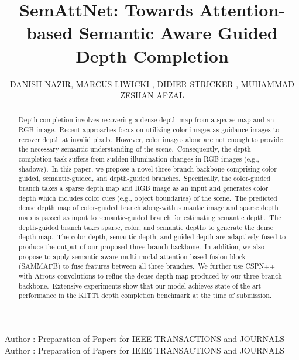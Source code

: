 \documentclass{ieeeaccess}
\begin{document}

\title{SemAttNet: Towards Attention-based Semantic Aware Guided Depth Completion}
\author{\uppercase{Danish Nazir},
\uppercase{Marcus Liwicki , Didier Stricker , Muhammad Zeshan Afzal 
}
}
\address[1]{Deutsches Forschungszentrum für Künstliche Intelligenz (DFKI) Trippstadter Str. 122, 67663 Kaiserslautern (e-mail: first.last@dfki.de)}
\address[2]{Luleå University of Technology (e-mail: first.last@ltu.se)}



\markboth
{Author \headeretal: Preparation of Papers for IEEE TRANSACTIONS and JOURNALS}
{Author \headeretal: Preparation of Papers for IEEE TRANSACTIONS and JOURNALS}



\begin{abstract}
Depth completion involves recovering a dense depth map from a sparse map and an RGB image.~Recent approaches focus on utilizing color images as guidance images to recover depth at invalid pixels.~However, color images alone are not enough to provide the necessary semantic understanding of the scene.~Consequently, the depth completion task suffers from sudden illumination changes in RGB images (e.g., shadows).~In this paper, we propose a novel three-branch backbone comprising color-guided, semantic-guided, and depth-guided branches.~Specifically, the color-guided branch takes a sparse depth map and RGB image as an input and generates color depth which includes color cues (e.g., object boundaries) of the scene.~The predicted dense depth map of color-guided branch along-with
semantic image and sparse depth map is passed as input to semantic-guided branch for estimating semantic depth.~The depth-guided branch takes sparse, color, and semantic depths to generate the dense depth map.~The color depth, semantic depth, and guided depth are adaptively fused to produce the output of our proposed three-branch backbone.~In addition, we also propose to apply semantic-aware multi-modal attention-based fusion block (SAMMAFB) to fuse features between all three branches.~We further use CSPN++ with Atrous convolutions to refine the dense depth map produced by our three-branch backbone.~Extensive experiments show that our model achieves state-of-the-art performance in the KITTI depth completion benchmark at the time of submission.
\end{abstract}
\end{document}

